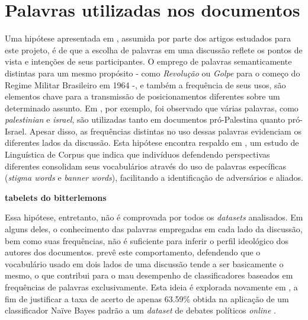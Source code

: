 \section{Palavras utilizadas nos documentos}

Uma hipótese apresentada em \cite{lin-et-al2006}, assumida por parte dos artigos estudados para este projeto, é de que a escolha de palavras em uma discussão reflete os pontos de vista e intenções de seus participantes. O emprego de palavras semanticamente distintas para um mesmo propósito - como \emph{Revolução} ou \emph{Golpe} para o começo do Regime Militar Brasileiro em 1964 -, e também a frequência de seus usos, são elementos chave para a transmissão de posicionamentos diferentes sobre um determinado assunto. Em \cite{lin-et-al2006}, por exemplo, foi observado que várias palavras, como \emph{palestinian} e \emph{israel}, são utilizadas tanto em documentos pró-Palestina quanto pró-Israel. Apesar disso, as frequências distintas no uso dessas palavras evidenciam os diferentes lados da discussão. Esta hipótese encontra respaldo em \cite{teubert2001}, um estudo de Linguística de Corpus \cite{biber-d1998}\cite{halliday2004} que indica que indivíduos defendendo perspectivas diferentes consolidam seus vocabulários através do uso de palavras específicas (\emph{stigma words} e \emph{banner words}), facilitando a identificação de adversários e aliados. 

\textbf{tabelets do bitterlemons} 

Essa hipótese, entretanto, não é comprovada por todos os \emph{datasets} analisados. Em alguns deles, o conhecimento das palavras empregadas em cada lado da discussão, bem como suas frequências, não é suficiente para inferir o perfil ideológico dos autores dos documentos. \cite{agrawal2003} prevê este comportamento, defendendo que o vocabulário usado em dois lados de uma discussão tende a ser basicamente o mesmo, o que contribui para o mau desempenho de classificadores baseados em frequências de palavras exclusivamente. Esta ideia é explorada novamente em \cite{malouf-taking_sides}, a fim de justificar a taxa de acerto de apenas 63.59\% obtida na aplicação de um classificador Naïve Bayes padrão a um \emph{dataset} de debates políticos \emph{online} \cite{www-politics-org}.

